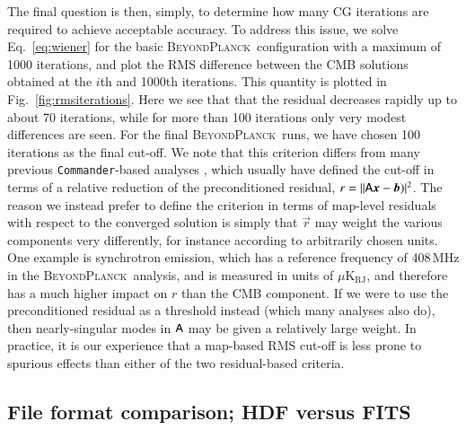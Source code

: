 \documentclass[twocolumn]{aa}
\def\commander{\texttt{Commander}}
\renewcommand{\b}[0]{\vec{b}}
\newcommand{\x}[0]{\vec{x}}
\newcommand{\A}[0]{\tens{A}}
\renewcommand{\r}[0]{\vec{r}}
\newcommand{\BP}{\textsc{BeyondPlanck}}
\begin{document}
The final question is then, simply, to determine how many CG
iterations are required to achieve acceptable accuracy. To address
this issue, we solve Eq.~\eqref{eq:wiener} for the basic
\BP\ configuration \citep{BP01} with a maximum of 1000 iterations, and
plot the RMS difference between the CMB solutions obtained at the
$i$th and 1000th iterations. This quantity is plotted in
Fig.~\ref{fig:rmsiterations}. Here we see that that the residual
decreases rapidly up to about 70 iterations, while for more than 100
iterations only very modest differences are seen. For the final
\BP\ runs, we have chosen 100 iterations as the final cut-off. We note
that this criterion differs from many previous \commander-based
analyses \citep[e.g.,][]{planck2014-a12}, which usually have defined
the cut-off in terms of a relative reduction of the preconditioned
residual, $r = ||\A\x-\b)|^2$. The reason we instead prefer to define
the criterion in terms of map-level residuals with respect to the
converged solution is simply that $\r$ may weight the various
components very differently, for instance according to arbitrarily
chosen units. One example is synchrotron emission, which has a
reference frequency of 408\,MHz in the \BP\ analysis, and is measured
in units of $\mu\textrm{K}_{\mathrm{RJ}}$, and therefore has a much
higher impact on $r$ than the CMB component. If we were to use the
preconditioned residual as a threshold instead (which many analyses
also do), then nearly-singular modes in $\A$ may be given a relatively
large weight. In practice, it is our experience that a map-based RMS
cut-off is less prone to spurious effects than either of the two
residual-based criteria.




\subsection{File format comparison; HDF versus FITS}
\end{document}

